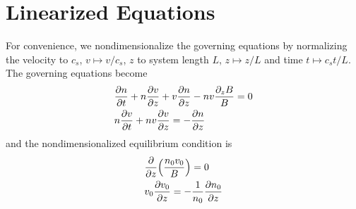 \section{Linearized Equations}
For convenience, we nondimensionalize the governing equations by normalizing the velocity to $c_s$, $v\mapsto v/c_s$, $z$ to system length $L$, $z \mapsto z/L$ and time $t\mapsto c_s t/L$. The governing equations become
\begin{align}
    &\pdv{n}{t} + n\pdv{v}{z} + v\pdv{n}{z} - nv\frac{\partial_z B}{B} = 0 \\
    &n\pdv{v}{t} + nv\pdv{v}{z} = -\pdv{n}{z}
\end{align}
and the nondimensionalized equilibrium condition is
\begin{align}
    &\pdv{z}(\frac{n_0v_0}{B}) = 0 \label{eq:equilibrium-convervation-of-mass}\\
    &v_0\pdv{v_0}{z} = -\frac{1}{n_0}\pdv{n_0}{z} \label{eq:equilibrium-convervation-of-momentum}
\end{align}

